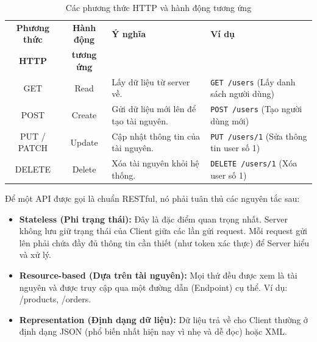 \begin{table}[h]
    \begin{tabular}{|c|c|m{4cm}|m{4cm}|}
        \hline
        \textbf{Phương thức} & \textbf{Hành động} & \centering\textbf{Ý nghĩa} & \centering\arraybackslash\textbf{Ví dụ} \\
        \textbf{HTTP} & \textbf{tương ứng} & & \\
        \hline
        GET & Read & Lấy dữ liệu từ server về. & \texttt{GET /users} \newline (Lấy danh sách người dùng) \\
        \hline
        POST & Create & Gửi dữ liệu mới lên để tạo tài nguyên. & \texttt{POST /users} \newline (Tạo người dùng mới) \\
        \hline
        PUT / PATCH & Update & Cập nhật thông tin của tài nguyên. & \texttt{PUT /users/1} \newline (Sửa thông tin user số 1) \\
        \hline
        DELETE & Delete & Xóa tài nguyên khỏi hệ thống. & \texttt{DELETE /users/1} \newline (Xóa user số 1) \\
        \hline
    \end{tabular}
    \centering
    \caption{Các phương thức HTTP và hành động tương ứng}
    \label{tab:http_methods}
\end{table}

Để một API được gọi là chuẩn RESTful, nó phải tuân thủ các nguyên tắc sau:
\begin{itemize}
    \item \textbf{Stateless (Phi trạng thái):} Đây là đặc điểm quan trọng nhất. Server không lưu giữ trạng thái của Client giữa các lần gửi request. 
    Mỗi request gửi lên phải chứa đầy đủ thông tin cần thiết (như token xác thực) để Server hiểu và xử lý.
    \item \textbf{Resource-based (Dựa trên tài nguyên):} Mọi thứ đều được xem là tài nguyên và được truy cập qua một đường dẫn (Endpoint) cụ thể. 
    Ví dụ: /products, /orders.
    \item \textbf{Representation (Định dạng dữ liệu):} Dữ liệu trả về cho Client thường ở định dạng JSON (phổ biến nhất hiện nay vì nhẹ và dễ đọc) hoặc XML.
\end{itemize}


